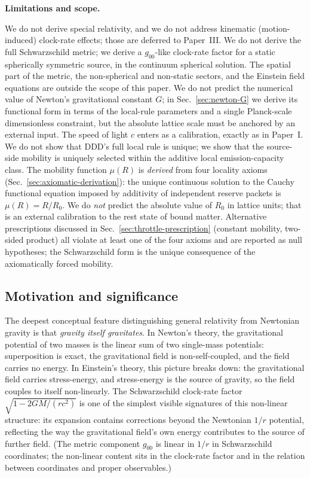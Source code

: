 \documentclass[11pt,a4paper]{article}
\begin{document}
\textbf{Limitations and scope.}

We do not derive special relativity, and we do not address
kinematic (motion-induced) clock-rate effects; those are
deferred to Paper~III. We do not derive the full Schwarzschild
metric; we derive a $g_{00}$-like clock-rate factor for a
static spherically symmetric source, in the continuum
spherical solution. The spatial part of the metric, the
non-spherical and non-static sectors, and the Einstein field
equations are outside the scope of this paper. We do not
predict the numerical value of Newton's gravitational constant
$G$; in Sec.~\ref{sec:newton-G} we derive its functional form
in terms of the local-rule parameters and a single Planck-scale
dimensionless constraint, but the absolute lattice scale must
be anchored by an external input. The speed of light $c$
enters as a calibration, exactly as in Paper~I.
We do not show that DDD's full local rule is unique; we
show that the source-side mobility is uniquely selected within
the additive local emission-capacity class. The mobility function
$\mu(R)$ is \emph{derived} from four locality axioms
(Sec.~\ref{sec:axiomatic-derivation}): the unique continuous
solution to the Cauchy functional equation imposed by additivity
of independent reserve packets is $\mu(R) = R/R_0$. We do
\emph{not} predict the absolute value of $R_0$ in lattice units;
that is an external calibration to the rest state of bound matter.
Alternative prescriptions discussed in
Sec.~\ref{sec:throttle-prescription} (constant mobility,
two-sided product) all violate at least one of the four axioms
and are reported as null hypotheses; the Schwarzschild form is
the unique consequence of the axiomatically forced mobility.

\subsection*{Motivation and significance}

The deepest conceptual feature distinguishing general relativity from
Newtonian gravity is that \emph{gravity itself gravitates}. In Newton's
theory, the gravitational potential of two masses is the linear sum
of two single-mass potentials: superposition is exact, the
gravitational field is non-self-coupled, and the field carries no
energy. In Einstein's theory, this picture breaks down: the
gravitational field carries stress-energy, and stress-energy is the
source of gravity, so the field couples to itself non-linearly. The
Schwarzschild clock-rate factor $\sqrt{1 - 2GM/(rc^2)}$ is one of the
simplest visible signatures of this non-linear structure: its
expansion contains corrections beyond the Newtonian $1/r$ potential,
reflecting the way the gravitational field's own energy contributes
to the source of further field. (The metric component $g_{00}$ is
linear in $1/r$ in Schwarzschild coordinates; the non-linear content
sits in the clock-rate factor and in the relation between coordinates
and proper observables.)
\end{document}
